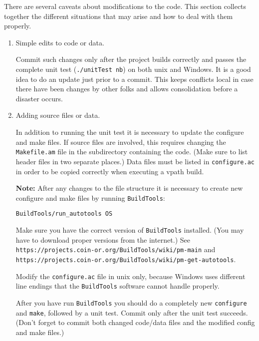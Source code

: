 \label{section:ModifyingProject} 

There are several caveats about modifications to the code. This section collects together the different situations that may arise and how to deal with them properly.

\begin{enumerate}

\item Simple edits to code or data.

Commit such changes only after the project builds correctly and passes the complete unit test 
({\tt ./unitTest nb}) on both unix and Windows. It is a good idea to do an update just prior to a commit. This keeps conflicts local in case there have been changes by other folks and allows consolidation before a disaster occurs. 

\item Adding source files or data.

In addition to running the unit test it is necessary to update the configure and make files. 
If source files are involved, this requires changing the {\tt Makefile.am} file in the subdirectory 
containing the code. (Make sure to list header files in two separate places.) Data files must be listed in 
{\tt configure.ac} in order to be copied correctly when executing a vpath build. 


{\bf Note:} After any changes to the file structure it is necessary to create new configure and make files by running {\tt BuildTools}:
\begin{verbatim}
BuildTools/run_autotools OS
\end{verbatim}

Make sure you have the correct version of {\tt BuildTools} installed. (You may have to download proper versions from the internet.)
See {\tt https://projects.coin-or.org/BuildTools/wiki/pm-main} and  {\tt https://projects.coin-or.org/BuildTools/wiki/pm-get-autotools}.

Modify the {\tt configure.ac} file in unix only, because Windows uses different line endings that the 
{\tt BuildTools} software cannot handle properly. 


\medskip

After you have run {\tt BuildTools} you should do a completely new {\tt configure} and {\tt make}, followed by a unit test. Commit only after the unit test succeeds. (Don't forget to commit both changed code/data files and the modified config and make files.)


\end{enumerate}
